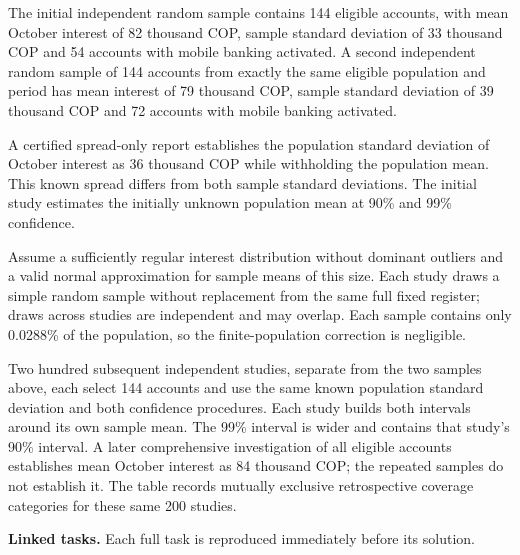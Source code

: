 The initial independent random sample contains 144 eligible accounts, with mean October interest of 82 thousand COP, sample standard deviation of 33 thousand COP and 54 accounts with mobile banking activated. A second independent random sample of 144 accounts from exactly the same eligible population and period has mean interest of 79 thousand COP, sample standard deviation of 39 thousand COP and 72 accounts with mobile banking activated.

A certified spread-only report establishes the population standard deviation of October interest as 36 thousand COP while withholding the population mean. This known spread differs from both sample standard deviations. The initial study estimates the initially unknown population mean at 90\% and 99\% confidence.

Assume a sufficiently regular interest distribution without dominant outliers and a valid normal approximation for sample means of this size. Each study draws a simple random sample without replacement from the same full fixed register; draws across studies are independent and may overlap. Each sample contains only 0.0288\% of the population, so the finite-population correction is negligible.

Two hundred subsequent independent studies, separate from the two samples above, each select 144 accounts and use the same known population standard deviation and both confidence procedures. Each study builds both intervals around its own sample mean. The 99\% interval is wider and contains that study's 90\% interval. A later comprehensive investigation of all eligible accounts establishes mean October interest as 84 thousand COP; the repeated samples do not establish it. The table records mutually exclusive retrospective coverage categories for these same 200 studies.



\textbf{Linked tasks.} Each full task is reproduced immediately before its solution.


